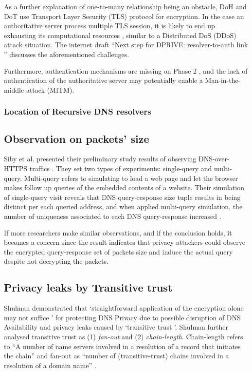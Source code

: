 As a further explanation of one-to-many relationship being an obstacle, DoH \cite{rfc8484} and DoT \cite{rfc7858} use Transport Layer Security (TLS) protocol \cite{rfc7858} for encryption. In the case an authoritative server process multiple TLS session, it is likely to end up exhausting its computational resources \cite{bhople2012server}, similar to a Distributed DoS (DDoS) attack situation. The internet draft ``Next step for DPRIVE: resolver-to-auth link \cite{I-D.bortzmeyer-dprive-step-2}'' discusses the aforementioned challenges.

Furthermore, authentication mechanisms are missing on Phase 2 \cite{I-D.bortzmeyer-dprive-step-2}, and the lack of authentication of the authoritative server may potentially enable a Man-in-the-middle attack (MITM).

\subsubsection{Location of Recursive DNS resolvers}\label{rr-location}

\FloatBarrier

\subsection{Observation on packets' size}
Siby et al. presented their preliminary study results of observing DNS-over-HTTPS traffics \cite{siby2018dns}.
They set two types of experiments: single-query and multi-query. Multi-query refers to simulating to load a web page and let the browser makes follow up queries of the embedded contents of a website.
Their simulation of single-query visit reveals that DNS query-response size tuple results in being distinct per each queried address, and when applied multi-query simulation, the number of uniqueness associated to each DNS query-response increased \cite{siby2018dns}.

If more researchers make similar observations, and if the conclusion holds, it becomes a concern since the result indicates that privacy attackers could observe the encrypted query-response set of packets size and induce the actual query despite not decrypting the packets.

\subsection{Privacy leaks by Transitive trust}
Shulman demonstrated that `straightforward application of the encryption alone may not suffice \cite{Shulman:2014}' for protecting DNS Privacy due to possible disruption of DNS Availability and privacy leaks caused by `transitive trust \cite{Ramasubramanian:2005}'.
Shulman further analysed transitive trust as (1) \textit{fan-out} and (2) \textit{chain-length}.
Chain-length refers to ``A number of name servers involved in a resolution of a record that initiates the chain'' and fan-out as ``number of (transitive-trust) chains involved in a resolution of a domain name'' \cite{Shulman:2014}.

